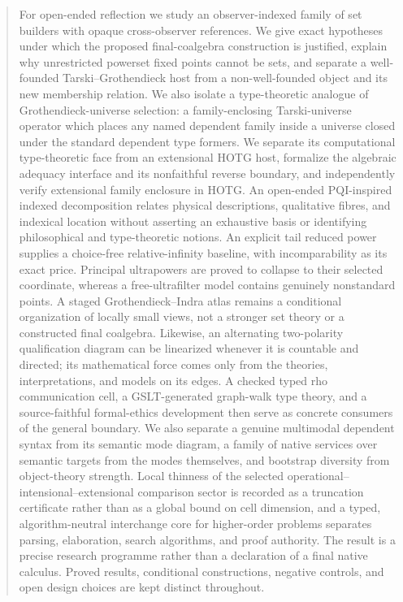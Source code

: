 \documentclass[11pt]{article}
\theoremstyle{definition}
\theoremstyle{remark}
\begin{document}
\begin{abstract}
For open-ended reflection we study an observer-indexed family of set builders
with opaque cross-observer references.  We give exact hypotheses under which
the proposed final-coalgebra construction is justified, explain why unrestricted
powerset fixed points cannot be sets, and separate a well-founded
Tarski--Grothendieck host from a non-well-founded object and its new membership
relation.  We also isolate a type-theoretic analogue of Grothendieck-universe
selection: a family-enclosing Tarski-universe operator which places any named
dependent family inside a universe closed under the standard dependent type
formers.  We separate its computational type-theoretic face from an extensional
HOTG host, formalize the algebraic adequacy interface and its nonfaithful reverse
boundary, and independently verify extensional family enclosure in HOTG.  An
open-ended PQI-inspired indexed decomposition relates physical descriptions,
qualitative fibres, and indexical location without asserting an exhaustive basis
or identifying philosophical and type-theoretic notions.  An explicit tail reduced
power supplies a choice-free relative-infinity baseline, with incomparability as
its exact price.  Principal ultrapowers are proved to collapse to their selected
coordinate, whereas a free-ultrafilter model contains genuinely nonstandard
points.  A staged Grothendieck--Indra atlas remains a conditional organization
of locally small views, not a stronger set theory or a constructed final
coalgebra.  Likewise, an alternating two-polarity qualification diagram can be
linearized whenever it is countable and directed; its mathematical force comes
only from the theories, interpretations, and models on its edges.  A checked
typed rho communication cell, a GSLT-generated graph-walk type theory, and a
source-faithful formal-ethics development then serve as concrete consumers of
the general boundary.  We also separate a genuine multimodal dependent syntax
from its semantic mode diagram, a family of native services over semantic
targets from the modes themselves, and bootstrap diversity from object-theory strength.
Local thinness of the selected operational--intensional--extensional
comparison sector is recorded as a truncation certificate rather than as a
global bound on cell dimension, and a typed, algorithm-neutral interchange
core for higher-order problems separates parsing, elaboration, search
algorithms, and proof authority.  The result is a
precise research programme rather than a declaration of a final native
calculus.  Proved results, conditional constructions, negative controls, and
open design choices are kept distinct throughout.
\end{abstract}
\end{document}

